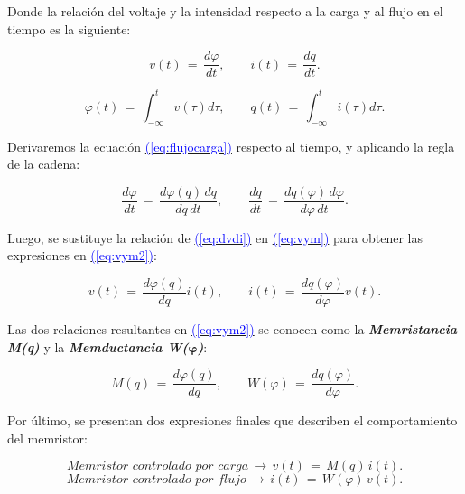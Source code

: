 \documentclass[12pt,a4paper]{report} %
\newcommand{\eref}[1]{\hyperref[#1]{\textcolor{blue}{(\ref*{#1})}}}
\newcommand{\eref}[1]{\hyperref[#1]{\textcolor{blue}{\textit{(\ref*{#1})}}}}
\begin{document}
	\noindent Donde la relación del voltaje y la intensidad respecto a la carga y al flujo en el tiempo es la siguiente:

	\begin{equation}
		v(t)\,=\,\frac{d\varphi}{dt}, \qquad i(t)\,=\,\frac{dq}{dt}.
		\label{eq:dvdi}
	\end{equation}
			
	\begin{equation}
		\varphi(t)\,=\,\int_{-\infty}^{t}v(\tau)d\tau, \qquad q(t)\,=\,\int_{-\infty}^{t}i(\tau)d\tau.
		\label{eq:flujocargaintegral}
	\end{equation}\smallskip
	
	\noindent Derivaremos la ecuación \eref{eq:flujocarga} respecto al tiempo, y aplicando la regla de la cadena:
	
	\begin{equation}
		\frac{d\varphi}{dt}\,=\,\frac{d\varphi(q)\,dq}{dq\,dt}, \qquad \frac{dq}{dt}\,=\,\frac{dq(\varphi)\,d\varphi}{d\varphi\,dt}.
		\label{eq:vym}
	\end{equation}\smallskip
	
	\vspace{0.5cm}\noindent Luego, se sustituye la relación de \eref{eq:dvdi} en \eref{eq:vym} para obtener las expresiones en \eref{eq:vym2}:
	
	\begin{equation}
		v(t)\,=\,\frac{d\varphi(q)}{dq}i(t), \qquad i(t)\,=\,\frac{dq(\varphi)}{d\varphi}v(t).
		\label{eq:vym2}
	\end{equation}\smallskip
	
	\vspace{0.5cm}\noindent Las dos relaciones resultantes en \eref{eq:vym2} se conocen como la \textbf{\textit{Memristancia M(q)}} y la \textbf{\textit{Memductancia W($\bm{\varphi}$)}}:
	
	\begin{equation}
		M(q)\,=\,\frac{d\varphi(q)}{dq}, \qquad W(\varphi)\,=\,\frac{dq(\varphi)}{d\varphi}.
		\label{eq:myw}
	\end{equation}\smallskip
	
	\vspace{0.5cm}\noindent Por último, se presentan dos expresiones finales que describen el comportamiento del memristor:
	
	\begin{equation}
		\textit{Memristor controlado por carga} \, \rightarrow \, v(t)\,=\,M(q)\,i(t).
		\label{eq:cc}
	\end{equation}\smallskip
	\begin{equation}
		\textit{Memristor controlado por flujo} \, \rightarrow \, i(t)\,=\,W(\varphi)\,v(t).
		\label{eq:fc}
	\end{equation}\smallskip
\end{document}
